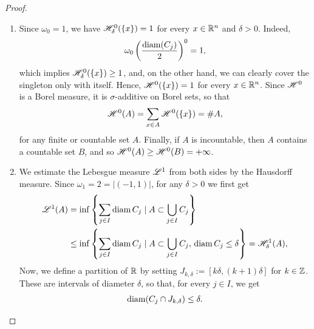 \begin{proof}~
\begin{enumerate}[(1)]
\item Since $\omega_0 = 1$, we have $\mathscr{H}^{0}_{\delta}(\{x\}) = 1$ for every $x \in \mathbb{R}^{n}$ and $\delta > 0$. Indeed, 
$$\omega_{0} \left(\frac{\operatorname{diam}(C_j)}{2}\right)^0 = 1,$$
which implies $\mathscr{H}^{0}_{\delta}(\{x\}) \ge 1$, and, on the other hand, we can clearly cover the singleton only with itself. Hence, $\mathscr{H}^{0}(\{x\}) = 1$ for every $x \in \mathbb{R}^{n}$. Since $\mathscr{H}^{0}$ is a Borel measure, it is $\sigma$-additive on Borel sets, so that
$$ \mathscr{H}^{0}(A) = \sum_{x \in A} \mathscr{H}^{0}(\{x\}) = \# A, $$
for any finite or countable set $A$. Finally, if $A$ is incountable, then $A$ contains a countable set $B$, and so $\mathscr{H}^{0}(A) \ge \mathscr{H}^{0}(B) = + \infty$.
\item We estimate the Lebesgue measure $\mathscr{L}^{1}$ from both sides by the
Hausdorff measure. Since $\omega_1 = 2 = |(-1,1)|$, for any $\delta > 0$ we first get 
\[
\begin{aligned}
\mathscr{L}^{1}(A) 
&= \inf \left\{ \sum_{j\in I} \operatorname{diam} C_j \mid A \subset \bigcup_{j\in I} C_j \right\}
\\ & \leq 
\inf \left\{ \sum_{j\in I} \operatorname{diam} C_j \mid A \subset \bigcup_{j\in I} C_j, \,
\operatorname{diam} C_j \leq \delta \right\}
= 
\mathscr{H}^{1}_\delta(A),
\end{aligned}
\]
Now, we define a partition of $\mathbb{R}$ by setting $J_{k,\delta} := [k\delta, (k+1)\delta]$
for $k \in \mathbb{Z}$. These are intervals of diameter
$\delta$, so that, for every $j \in I$, we get 
\begin{equation} \label{eq:diam_J_k_delta}
\operatorname{diam}(C_j \cap J_{k,\delta}) \leq \delta.
\end{equation}

\end{enumerate}
\end{proof}
